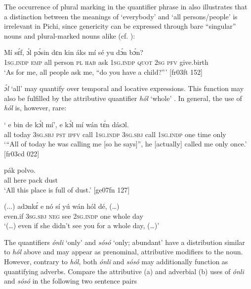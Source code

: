 The occurrence of plural marking in the quantifier phrase in  also illustrates that a distinction between the meanings of ‘everybody’ and ‘all persons/people’ is irrelevant in Pichi, since genericity can be expressed through bare “singular” nouns and plural-marked nouns alike (cf. ):



\ea%
    \label{ex:key:263}
    \gll Mí    sɛ́f,  ɔ́l  pɔ́sin  dɛn  kin  áks  mí    sé    yu  dɔ́n  bɔ́n?\\
\textsc{1sg.indp}  \textsc{emp}  all  person  \textsc{pl}  \textsc{hab}  ask  \textsc{1sg.indp}  \textsc{quot}  \textsc{2sg}  \textsc{pfv}  give.birth\\

\glt ‘As for me, all people ask me, “do you have a child?”’ [fr03ft 152]
\z

\textit{ɔ́l} ‘all’ may quantify over temporal  and locative  expressions. This function may also be fulfilled by the attributive quantifier \textit{hól} ‘whole’ . In general, the use of \textit{hól} is, however, rare: 


\ea%
    \label{ex:key:264}
    \gll ‘      e    bin  de  kɔ́l  mí’,    e    kɔ́l  mí
wán    tɛ́n    dásɔl.\\
all  today  \textsc{3sg.sbj}  \textsc{pst}  \textsc{ipfv}  call  \textsc{1sg.indp}  \textsc{3sg.sbj}  call  \textsc{1sg.indp}
one    time    only\\

\glt ‘“All of today he was calling me [so he says]”, he [actually] called me only 
once.’ [fr03cd 022]
\z


\ea%
    \label{ex:key:265}
    \gll {}     pák  polvo.\\
all  here    pack  dust\\

\glt ‘All this place is full of dust.’ [ge07fn 127]
\z


\ea%
    \label{ex:key:266}
    \gll (...)  adɔnkɛ́  e    nó  sí  yú    wán    hól    dé,  (…)\\
 {} even.if  \textsc{3sg.sbj}  \textsc{neg}  see  \textsc{2sg.indp}  one    whole  day  \\

\glt ‘(…) even if she didn’t see you for a whole day, (…)’
\z

The quantifiers \textit{ónli} ‘only’ and\textit{ sósó} ‘only; abundant’ have a distribution similar to \textit{hól} above and may appear as prenominal, attributive modifiers to the noun. However, contrary to \textit{hól}, both \textit{ónli} and \textit{sósó} may additionally function as quantifying adverbs. Compare the attributive (a) and adverbial (b) uses of \textit{ónli}  and \textit{sósó}  in the following two sentence pairs\textstyleannotationreference{:} 


